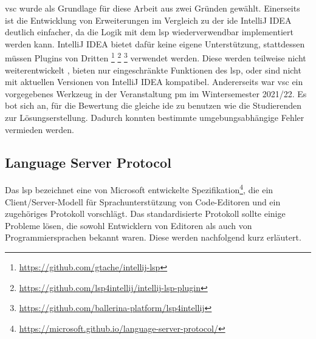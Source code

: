 \ac{vsc} wurde als Grundlage für diese Arbeit aus zwei Gründen gewählt.
Einerseits ist die Entwicklung von Erweiterungen im Vergleich zu der \ac{ide} IntelliJ IDEA deutlich einfacher, da die Logik mit dem \ac{lsp} wiederverwendbar implementiert werden kann.
IntelliJ IDEA bietet dafür keine eigene Unterstützung, stattdessen müssen Plugins von Dritten
\footnote{\url{https://github.com/gtache/intellij-lsp}\label{fn:intellij-lsp}}
\footnote{\url{https://github.com/lsp4intellij/intellij-lsp-plugin}\label{fn:intellij-lsp-plugin}}
\footnote{\url{https://github.com/ballerina-platform/lsp4intellij}\label{fn:lsp4intellij}}
verwendet werden.
Diese werden teilweise nicht weiterentwickelt , bieten nur eingeschränkte Funktionen des \ac{lsp}, oder sind nicht mit aktuellen Versionen von IntelliJ IDEA kompatibel.
Andererseits war \ac{vsc} ein vorgegebenes Werkzeug in der Veranstaltung \ac{pm} im Wintersemester 2021/22.
Es bot sich an, für die Bewertung die gleiche \ac{ide} zu benutzen wie die Studierenden zur Lösungserstellung.
Dadurch konnten bestimmte umgebungsabhängige Fehler vermieden werden.

\subsection{Language Server Protocol}\label{subsec:language-server-protocol}

Das \ac{lsp} bezeichnet eine von Microsoft entwickelte Spezifikation\footnote{\url{https://microsoft.github.io/language-server-protocol/}}, die ein Client/Server-Modell für Sprachunterstützung von Code-Editoren und ein zugehöriges Protokoll vorschlägt.
Das standardisierte Protokoll sollte einige Probleme lösen, die sowohl Entwicklern von Editoren als auch von Programmiersprachen bekannt waren.
Diese werden nachfolgend kurz erläutert.

